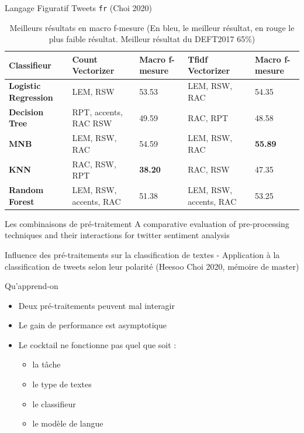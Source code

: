 \begin{frame}{Langage Figuratif Tweets  \texttt{fr} (Choi 2020)}
\begin{table}[!h]
\centering
\begin{small}
	\begin{tabular}{|p{1.8cm}|p{2.8cm}|p{1cm}|p{2.8cm}|p{1cm}|}
	\hline
    \textbf{Classifieur}& \textbf{Count Vectorizer} & \textbf{Macro \mbox{f-mesure}} & \textbf{Tfidf Vectorizer} & \textbf{Macro \mbox{f-mesure}}\\
	\hline
	\textbf{Logistic Regression} & LEM, \mbox{RSW}	& 53.53  &	LEM, \mbox{RSW}, \mbox{RAC} & 54.35 \\
	\hline
	\textbf{Decision Tree}	& RPT, \mbox{accents}, \mbox{RAC} \mbox{RSW}	& 49.59  & RAC, \mbox{RPT} & 48.58 \\
	\hline
	\textbf{MNB} & LEM, \mbox{RSW}, \mbox{RAC} & 54.59  & LEM, \mbox{RSW}, \mbox{RAC}	& {\color{blue}\textbf{55.89}}\\
	\hline
	\textbf{KNN} & RAC, \mbox{RSW}, \mbox{RPT}	& {\color{red}\textbf{38.20 }} & RAC, \mbox{RSW} & 47.35 \\
	\hline
	\textbf{Random Forest} & LEM, \mbox{RSW}, \mbox{accents}, \mbox{RAC} & 51.38  & LEM, \mbox{RSW}, \mbox{accents}, \mbox{RAC} & 53.25\\
	\hline
	\end{tabular}
\end{small}
\caption{Meilleurs résultats en macro f-mesure (En bleu, le meilleur résultat, en rouge le plus faible résultat. Meilleur résultat du DEFT2017 65\%) \label{best_res}}
\end{table}

\end{frame}

\begin{frame}{Les combinaisons de pré-traitement}
A comparative evaluation of pre-processing techniques and their interactions for twitter sentiment analysis \cite{Symeonidis-2018}
\pause

Influence des pré-traitements sur la classification de textes - Application à la classification de tweets selon leur polarité (Heesoo Choi 2020, mémoire de master)
\pause
\begin{block}{Qu'apprend-on}
  \begin{itemize}
    \item Deux pré-traitements peuvent mal interagir
    \item Le gain de performance est asymptotique
\pause
    \item Le cocktail ne fonctionne pas quel que soit :
     \begin{itemize}
        \item la tâche
        \item le type de textes
        \item le classifieur
        \item le modèle de langue 
    \end{itemize}
  \end{itemize}
\end{block}
\end{frame}

